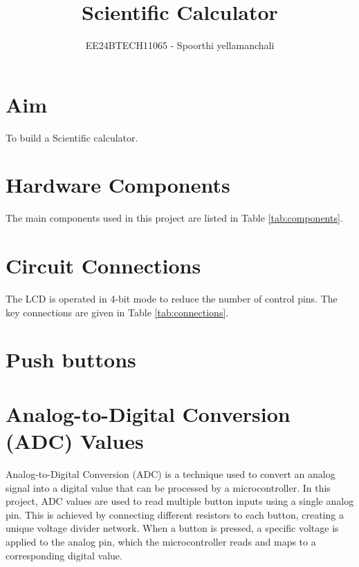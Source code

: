 \documentclass[journal]{IEEEtran}
\begin{document}

\vspace{3cm}

\title{Scientific Calculator}
\author{EE24BTECH11065 - Spoorthi yellamanchali
}
{\let\newpage\relax\maketitle}

\renewcommand{\thefigure}{\theenumi}
\renewcommand{\thetable}{\theenumi}
\setlength{\intextsep}{10pt} %


\renewcommand{\thetable}{\theenumi}


\section{Aim}
To build a Scientific calculator.

\section{Hardware Components}
The main components used in this project are listed in Table \ref{tab:components}.



\section{Circuit Connections}
The LCD is operated in 4-bit mode to reduce the number of control pins. The key connections are given in Table \ref{tab:connections}.



\section{Push buttons}


\section{Analog-to-Digital Conversion (ADC) Values}
Analog-to-Digital Conversion (ADC) is a technique used to convert an analog signal into a digital value that can be processed by a microcontroller. In this project, ADC values are used to read multiple button inputs using a single analog pin. This is achieved by connecting different resistors to each button, creating a unique voltage divider network. When a button is pressed, a specific voltage is applied to the analog pin, which the microcontroller reads and maps to a corresponding digital value.
\end{document}
